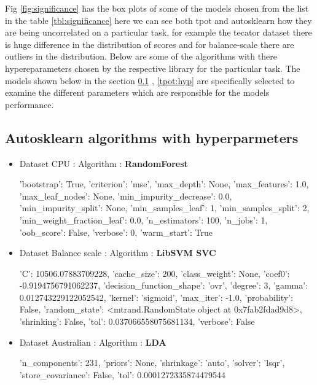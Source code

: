 Fig \ref{fig:significance} has the box plots of some of the models chosen from the list in the table \ref{tbl:significance} here we can see both tpot and autosklearn how they are being uncorrelated on a particular task, for example the tecator dataset there is huge difference in the distribution of scores and for balance-scale there are outliers in the distribution. Below are some of the algorithms with there hypereparameters chosen by the respective library for the particular task. The models shown below in the section \ref{auto:hyp} , \ref{tpot:hyp} are specifically selected to examine the different parameters which are responsible for the models performance.

\subsection{Autosklearn algorithms with hyperparmeters}
\label{auto:hyp}
\begin{itemize}
\item 
Dataset CPU : Algorithm : \textbf{RandomForest}

\begin{spverbatim}
{'bootstrap': True, 'criterion': 'mse', 'max_depth': None, 'max_features': 1.0, 'max_leaf_nodes': None, 'min_impurity_decrease': 0.0, 
'min_impurity_split': None, 'min_samples_leaf': 1, 'min_samples_split': 2, 'min_weight_fraction_leaf': 0.0, 'n_estimators': 100, 'n_jobs': 1, 
'oob_score': False, 
'verbose': 0, 'warm_start': True}
\end{spverbatim}

\item
Dataset Balance scale : Algorithm : \textbf{ LibSVM SVC}
\begin{spverbatim}
{'C': 10506.07883709228, 'cache_size': 200, 'class_weight': None, 'coef0': -0.9194756791062237, 'decision_function_shape': 'ovr', 'degree': 3, 'gamma': 0.012743229122052542, 'kernel': 'sigmoid', 'max_iter': -1.0, 'probability': False, 'random_state': <mtrand.RandomState object at 0x7fab2fdad9d8>, 'shrinking': False, 'tol': 0.037066558075681134, 'verbose': False}
\end{spverbatim}

\item
Dataset Australian : Algorithm : \textbf{LDA}
\begin{spverbatim}
{'n_components': 231, 'priors': None, 'shrinkage': 'auto', 'solver': 'lsqr', 'store_covariance': False, 'tol': 0.0001272335874479544}
\end{spverbatim}

\end{itemize}

